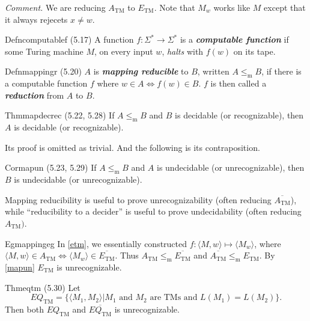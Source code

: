 \textit{Comment.} We are reducing $A_{\mathrm{TM}}$ to $E_{\mathrm{TM}}$. Note that $M_w$ works like $M$ except that it always rejecets $x\neq w$.

\begin{reference}{Defn}{computablef}
  (5.17) A function $f:\Sigma^*\to \Sigma^*$ is a \textbf{\textit{computable function}} if some Turing machine $M$, on every input $w$, \textit{halts} with $f(w)$ on its tape.
\end{reference}

\begin{reference}{Defn}{mappingr}
  (5.20) $A$ is \textbf{\textit{mapping reducible}} to $B$, written $A\leq_{\mathrm{m}} B$, if there is a computable function $f$ where $w\in A \Leftrightarrow f(w)\in B$. $f$ is then called a \textbf{\textit{reduction}} from $A$ to $B$.
\end{reference}

\begin{reference}{Thm}{mapdecrec}
  (5.22, 5.28) If $A\leq_{\mathrm{m}} B$ and $B$ is decidable (or recognizable), then $A$ is decidable (or recognizable).
\end{reference}

Its proof is omitted as trivial. And the following is its contraposition.

\begin{reference}{Cor}{mapun}
  (5.23, 5.29) If $A\leq_{\mathrm{m}} B$ and $A$ is undecidable (or unrecognizable), then $B$ is undecidable (or unrecognizable).
\end{reference}

Mapping reducibility is useful to prove unrecognizability (often reducing $\overline{A_{\mathrm{TM}}}$), while ``reducibility to a decider'' is useful to prove undecidability (often reducing $A_{\mathrm{TM}})$.

\begin{reference}{Eg}{mappingeg}
  In \ref{etm}, we essentially constructed $f:\langle M,w\rangle\mapsto\langle M_w\rangle$, where $\langle M,w\rangle\in A_{\mathrm{TM}}\Leftrightarrow\langle M_w\rangle\in \overline{E_{\mathrm{TM}}}$. Thus $A_{\mathrm{TM}}\leq_{\mathrm{m}} \overline{E_{\mathrm{TM}}}$ and $\overline{A_{\mathrm{TM}}}\leq_{\mathrm{m}} E_{\mathrm{TM}}$. By \ref{mapun} $E_{\mathrm{TM}}$ is unrecognizable.
\end{reference}

\begin{reference}{Thm}{eqtm}
  (5.30) Let
  \[
    EQ_{\mathrm{TM}}=\{\langle M_1,M_2\rangle|M_1\text{ and }M_2\text{ are TMs and }L(M_1)=L(M_2)\}.
  \]
  Then both $EQ_{\mathrm{TM}}$ and $\overline{EQ_{\mathrm{TM}}}$ is unrecognizable.
\end{reference}

